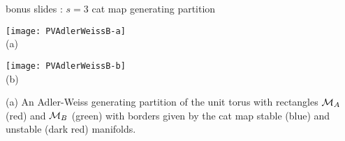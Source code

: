 \begin{frame}{bonus slides : $s=3$ cat map generating partition}
\begin{center}
            \begin{minipage}[c]{0.23\textwidth}\begin{center}
\texttt{[image: PVAdlerWeissB-a]}\\(a)
            \end{center}\end{minipage}
            \begin{minipage}[c]{0.23\textwidth}\begin{center}
\texttt{[image: PVAdlerWeissB-b]}\\(b)
            \end{center}\end{minipage}
\end{center}
(a)
An Adler-Weiss generating partition of the unit torus with rectangles
$\mathcal{M}_A$ (red) and $\mathcal{M}_B$ (green)
with borders given by the cat map stable (blue) and
unstable (dark red) manifolds.
\end{frame}

